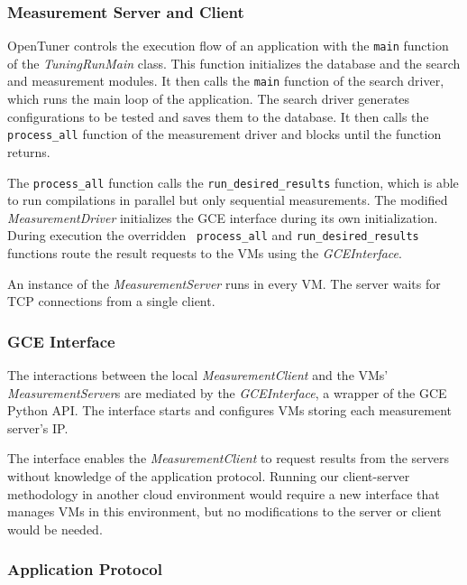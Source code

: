 \subsubsection{Measurement Server and Client}
\label{sec:server-client}

OpenTuner controls the execution flow of an application with the
\texttt{\footnotesize main} function of the \emph{TuningRunMain} class. This
function initializes the database and the search and measurement modules. It
then calls the \texttt{\footnotesize main} function of the search driver, which
runs the main loop of the application.  The search driver generates
configurations to be tested and saves them to the database. It then calls the
\texttt{\footnotesize process\_all} function of the measurement driver and
blocks until the function returns.

The \texttt{\footnotesize process\_all} function calls the
\texttt{\footnotesize run\_desired\_results} function, which is able to run
compilations in parallel but only sequential measurements.  The modified
\emph{MeasurementDriver} initializes the GCE interface during its own
initialization. During execution the overridden \texttt{\footnotesize
process\_all} and \texttt{\footnotesize run\_desired\_results} functions route
the result requests to the VMs using the \emph{GCEInterface}.

An instance of the \emph{MeasurementServer} runs in every VM. The server waits
for TCP connections from a single client.

\subsubsection{GCE Interface}
\label{sec:gce}

The interactions between the local \emph{MeasurementClient} and the VMs'
\emph{MeasurementServer}s are mediated by the \emph{GCEInterface}, a wrapper of
the GCE Python API.  The interface starts and configures VMs storing each
measurement server's IP.

The interface enables the \emph{MeasurementClient} to request results from the
servers without knowledge of the application protocol. Running our
client-server methodology in another cloud environment would require a new
interface that manages VMs in this environment, but no modifications to the
server or client would be needed.

\subsubsection{Application Protocol}
\label{sec:app}

